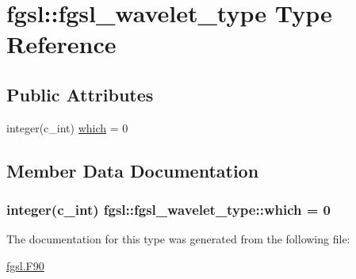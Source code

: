 \hypertarget{structfgsl_1_1fgsl__wavelet__type}{}\section{fgsl\+:\+:fgsl\+\_\+wavelet\+\_\+type Type Reference}
\label{structfgsl_1_1fgsl__wavelet__type}
\subsection*{Public Attributes}
\begin{DoxyCompactItemize}
\item 
integer(c\+\_\+int) \hyperlink{structfgsl_1_1fgsl__wavelet__type_a8dd95cc4a21d5f8f450959d451d515a5}{which} = 0
\end{DoxyCompactItemize}


\subsection{Member Data Documentation}
\hypertarget{structfgsl_1_1fgsl__wavelet__type_a8dd95cc4a21d5f8f450959d451d515a5}{}
\subsubsection[{which}]{\setlength{\rightskip}{0pt plus 5cm}integer(c\+\_\+int) fgsl\+::fgsl\+\_\+wavelet\+\_\+type\+::which = 0}\label{structfgsl_1_1fgsl__wavelet__type_a8dd95cc4a21d5f8f450959d451d515a5}


The documentation for this type was generated from the following file\+:\begin{DoxyCompactItemize}
\item 
\hyperlink{fgsl_8F90}{fgsl.\+F90}\end{DoxyCompactItemize}
